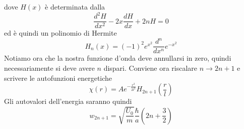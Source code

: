\documentclass[a4paper]{article}
\begin{document}
        dove $H(x)$ è determinata dalla
        \begin{equation*}
            \frac{d^2H}{dx^2}-2x\frac{dH}{dx}+2nH=0
        \end{equation*}
        ed è quindi un polinomio di Hermite
        \begin{equation*}
            H_n(x)=(-1)^2e^{x^2}\frac{d^n}{dx^n}e^{-x^2}
        \end{equation*}
        Notiamo ora che la nostra funzione d'onda deve annullarsi in zero, quindi necessariamente si deve avere $n$ dispari.
        Conviene ora riscalare $n\to 2n+1$ e scrivere le autofunzioni energetiche
        \begin{equation*}
            \chi(r)=Ae^{-\frac{r^2}{2l^2}}H_{2n+1}\left(\frac{r}{l}\right)
        \end{equation*}
        Gli autovalori dell'energia saranno quindi
        \begin{equation*}
            w_{2n+1}=\sqrt{\frac{U_0}{m}}\frac{\hbar}{a}\left(2n+\frac{3}{2}\right)
        \end{equation*}

    
\end{document}
